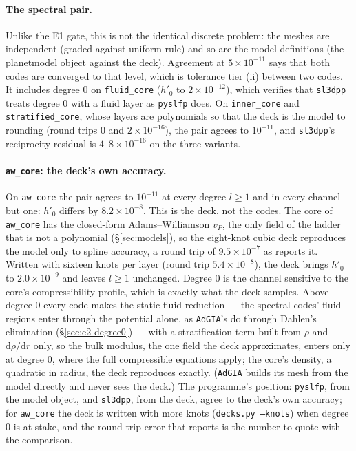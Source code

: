 \documentclass[11pt]{article}
\numberwithin{equation}{section}
\newcommand{\code}[1]{\texttt{#1}}
\begin{document}
\paragraph{The spectral pair.} Unlike the E1 gate, this is not the identical
discrete problem: the meshes are independent (graded against uniform rule)
and so are the model definitions (the planetmodel object against the deck).
Agreement at $5\times10^{-11}$ says that both codes are converged to that
level, which is tolerance tier (ii) between two codes. It includes degree 0
on \code{fluid\_core} ($h'_0$ to $2\times10^{-12}$), which verifies that
\code{sl3dpp} treats degree 0 with a fluid layer as \code{pyslfp} does. On
\code{inner\_core} and \code{stratified\_core}, whose layers are
polynomials so that the deck is the model to rounding (round trips 0 and
$2\times10^{-16}$), the pair agrees to $10^{-11}$, and \code{sl3dpp}'s
reciprocity residual is $4$--$8\times10^{-16}$ on the three variants.

\paragraph{\code{aw\_core}: the deck's own accuracy.} On \code{aw\_core}
the pair agrees to $10^{-11}$ at every degree $l\ge1$ and in every channel
but one: $h'_0$ differs by $8.2\times10^{-8}$. This is the deck, not the
codes. The core of \code{aw\_core} has the closed-form Adams--Williamson
$v_P$, the only field of the ladder that is not a polynomial
(\S\ref{sec:models}), so the eight-knot cubic deck reproduces the model
only to spline accuracy, a round trip of $9.5\times10^{-7}$ as
 reports it. Written with sixteen knots per layer (round
trip $5.4\times10^{-8}$), the deck brings $h'_0$ to $2.0\times10^{-9}$ and
leaves $l\ge1$ unchanged. Degree 0 is the channel sensitive to the core's
compressibility profile, which is exactly what the deck samples. Above
degree 0 every code makes the static-fluid reduction --- the spectral
codes' fluid regions enter through the potential alone, as \code{AdGIA}'s
do through Dahlen's elimination (\S\ref{sec:e2-degree0}) --- with a
stratification term built from $\rho$ and $\mathrm{d}\rho/\mathrm{d}r$
only, so the bulk modulus, the one field the deck approximates, enters
only at degree 0, where the full compressible equations apply; the core's
density, a quadratic in radius, the deck reproduces exactly. (\code{AdGIA}
builds its mesh from the model directly and never sees the deck.) The
programme's position:
\code{pyslfp}, from the model object, and \code{sl3dpp}, from the deck,
agree to the deck's own accuracy; for \code{aw\_core} the deck is written
with more knots (\code{decks.py --knots}) when degree 0 is at stake, and the
round-trip error that  reports is the number to quote with
the comparison.
\end{document}
